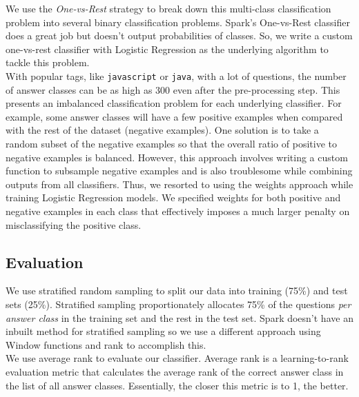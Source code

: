 \documentclass{article}
\begin{document}
We use the \textit{One-vs-Rest} strategy to break down this multi-class classification problem into several binary classification problems. Spark's One-vs-Rest classifier does a great job but doesn't output probabilities of classes. So, we write a custom one-vs-rest classifier with Logistic Regression as the underlying algorithm to tackle this problem.\\

With popular tags, like \texttt{javascript} or \texttt{java}, with a lot of questions, the number of answer classes can be as high as 300 even after the pre-processing step. This presents an imbalanced classification problem for each underlying classifier. For example, some answer classes will have a few positive examples when compared with the rest of the dataset (negative examples). One solution is to take a random subset of the negative examples so that the overall ratio of positive to negative examples is balanced. However, this approach involves writing a custom function to subsample negative examples and is also troublesome while combining outputs from all classifiers. Thus, we resorted to using the weights approach while training Logistic Regression models. We specified weights for both positive and negative examples in each class that effectively imposes a much larger penalty on misclassifying the positive class.

\subsection{Evaluation}
We use stratified random sampling to split our data into training (75\%) and test sets (25\%). Stratified sampling proportionately allocates 75\% of the questions \textit{per answer class} in the training set and the rest in the test set. Spark doesn't have an inbuilt method for stratified sampling so we use a different approach using Window functions and rank to accomplish this.\\

We use average rank to evaluate our classifier. Average rank is a learning-to-rank evaluation metric that calculates the average rank of the correct answer class in the list of all answer classes. Essentially, the closer this metric is to 1, the better.
\end{document}
